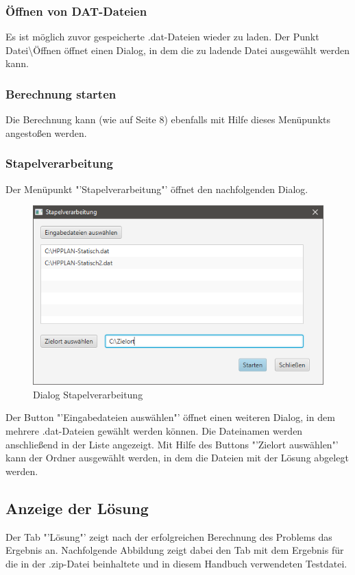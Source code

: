 \documentclass[12pt,a4paper, listof=entryprefix, bibliography=totocnumbered,toc=listofnumbered,lof=listofnumbered]{scrartcl}
\begin{document}
\subsubsection{Öffnen von DAT-Dateien}
Es ist möglich zuvor gespeicherte .dat-Dateien wieder zu laden. Der Punkt Datei\textbackslash Öffnen öffnet einen Dialog, in dem die zu ladende Datei ausgewählt werden kann.

\subsubsection{Berechnung starten}
Die Berechnung kann (wie auf Seite 8) ebenfalls mit Hilfe dieses Menüpunkts angestoßen werden.

\subsubsection{Stapelverarbeitung}
Der Menüpunkt "'Stapelverarbeitung"' öffnet den nachfolgenden Dialog.

\begin{figure}[H]
	\centering
	\includegraphics[width=.7\linewidth]{images/stapelverarbeitung.png} 
	\caption{Dialog Stapelverarbeitung}
	\label{fig:stapel}
\end{figure}

Der Button "'Eingabedateien auswählen"' öffnet einen weiteren Dialog, in dem mehrere .dat-Dateien gewählt werden können. Die Dateinamen werden anschließend in der Liste angezeigt. Mit Hilfe des Buttons "'Zielort auswählen"' kann der Ordner ausgewählt werden, in dem die Dateien mit der Lösung abgelegt werden.

\subsection{Anzeige der Lösung}
Der Tab "'Lösung"' zeigt nach der erfolgreichen Berechnung des Problems das Ergebnis an. Nachfolgende Abbildung zeigt dabei den Tab mit dem Ergebnis für die in der .zip-Datei beinhaltete und in diesem Handbuch verwendeten Testdatei.
\end{document}
